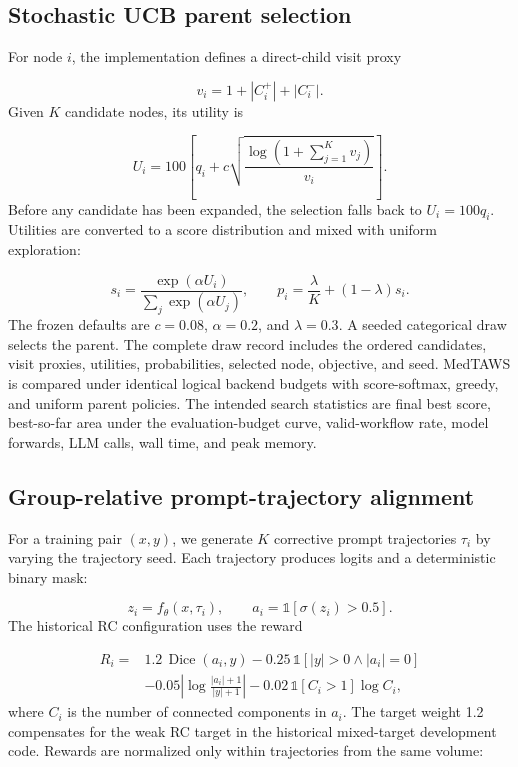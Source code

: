 \documentclass[10pt]{article}
\begin{document}
\subsection{Stochastic UCB parent selection}
For node \(i\), the implementation defines a direct-child visit proxy

\[
v_i=1+|C_i^+|+|C_i^-|.
\]
Given \(K\) candidate nodes, its utility is

\[
U_i=100\left[q_i+c\sqrt{\frac{\log(1+\sum_{j=1}^{K}v_j)}{v_i}}\right].
\]
Before any candidate has been expanded, the selection falls back to \(U_i=100q_i\). Utilities are converted to a score distribution and mixed with uniform exploration:

\[
s_i=\frac{\exp(\alpha U_i)}{\sum_j\exp(\alpha U_j)},\qquad
p_i=\frac{\lambda}{K}+(1-\lambda)s_i.
\]
The frozen defaults are \(c=0.08\), \(\alpha=0.2\), and \(\lambda=0.3\). A seeded categorical draw selects the parent. The complete draw record includes the ordered candidates, visit proxies, utilities, probabilities, selected node, objective, and seed. MedTAWS is compared under identical logical backend budgets with score-softmax, greedy, and uniform parent policies. The intended search statistics are final best score, best-so-far area under the evaluation-budget curve, valid-workflow rate, model forwards, LLM calls, wall time, and peak memory.

\subsection{Group-relative prompt-trajectory alignment}
For a training pair \((x,y)\), we generate \(K\) corrective prompt trajectories \(\tau_i\) by varying the trajectory seed. Each trajectory produces logits and a deterministic binary mask:

\[
z_i=f_\theta(x,\tau_i),\qquad a_i=\mathbb{1}[\sigma(z_i)>0.5].
\]
The historical RC configuration uses the reward

\[
\begin{split}
R_i ={}& 1.2\,\operatorname{Dice}(a_i,y)
-0.25\,\mathbb{1}[|y|>0\land|a_i|=0]\\
&-0.05\left|\log\frac{|a_i|+1}{|y|+1}\right|
-0.02\,\mathbb{1}[C_i>1]\log C_i,
\end{split}
\]
where \(C_i\) is the number of connected components in \(a_i\). The target weight 1.2 compensates for the weak RC target in the historical mixed-target development code. Rewards are normalized only within trajectories from the same volume:
\end{document}

